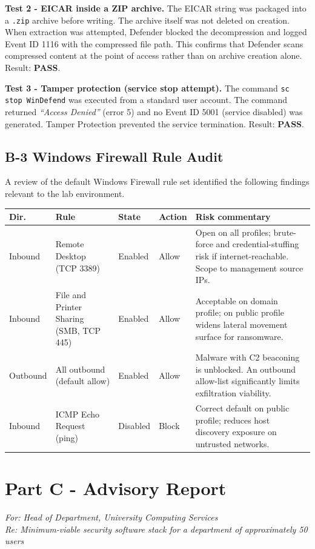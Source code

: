 \documentclass[10pt,a4paper]{article}
\begin{document}
\textbf{Test 2 - EICAR inside a ZIP archive.} The EICAR string was packaged into a \texttt{.zip} archive before writing. The archive itself was not deleted on creation. When extraction was attempted, Defender blocked the decompression and logged Event ID 1116 with the compressed file path. This confirms that Defender scans compressed content at the point of access rather than on archive creation alone. Result: \textbf{PASS}.

\textbf{Test 3 - Tamper protection (service stop attempt).} The command \texttt{sc stop WinDefend} was executed from a standard user account. The command returned \textit{``Access Denied''} (error 5) and no Event ID 5001 (service disabled) was generated. Tamper Protection prevented the service termination. Result: \textbf{PASS}.

\subsection*{B-3 Windows Firewall Rule Audit}
A review of the default Windows Firewall rule set identified the following findings relevant to the lab environment.

\begin{longtable}{p{1.5cm}p{4.6cm}p{1.6cm}p{1.4cm}p{5.1cm}}
\toprule
Dir. & Rule & State & Action & Risk commentary \\
\midrule
Inbound & Remote Desktop (TCP 3389) & Enabled & Allow & Open on all profiles; brute-force and credential-stuffing risk if internet-reachable. Scope to management source IPs. \\
Inbound & File and Printer Sharing (SMB, TCP 445) & Enabled & Allow & Acceptable on domain profile; on public profile widens lateral movement surface for ransomware. \\
Outbound & All outbound (default allow) & Enabled & Allow & Malware with C2 beaconing is unblocked. An outbound allow-list significantly limits exfiltration viability. \\
Inbound & ICMP Echo Request (ping) & Disabled & Block & Correct default on public profile; reduces host discovery exposure on untrusted networks. \\
\bottomrule
\end{longtable}

\section*{Part C - Advisory Report}
\textit{For: Head of Department, University Computing Services \\ Re: Minimum-viable security software stack for a department of approximately 50 users}
\end{document}
